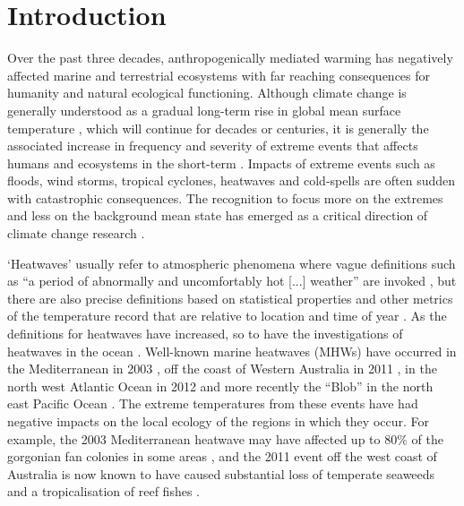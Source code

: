 \documentclass[a4paper,10pt,review]{elsarticle}
\begin{document}
\linenumbers

\section{Introduction}
Over the past three decades, anthropogenically mediated warming has negatively affected marine and terrestrial ecosystems with far reaching consequences for humanity and natural ecological functioning. Although climate change is generally understood as a gradual long-term rise in global mean surface temperature \citep{IPCC2014}, which will continue for decades or centuries, it is generally the associated increase in frequency and severity of extreme events that affects humans and ecosystems in the short-term \citep{Easterling2000}. Impacts of extreme events such as floods, wind storms, tropical cyclones, heatwaves and cold-spells are often sudden with catastrophic consequences. The recognition to focus more on the extremes and less on the background mean state has emerged as a critical direction of climate change research \citep{Jentsch2007}.

`Heatwaves' usually refer to atmospheric phenomena where vague definitions such as ``a period of abnormally and uncomfortably hot [...] weather'' are invoked \citep{Glickman2000}, but there are also precise definitions based on statistical properties and other metrics of the temperature record that are relative to location and time of year \citep[e.g.][]{Meehl2004, Alexander2006, Fischer2010, Fischer2011, Perkins2013}. As the definitions for heatwaves have increased, so to have the investigations of heatwaves in the ocean \citep[e.g.][]{Mackenzie2007, Selig2010, Sura2011, Lima2012, DeCastro2014}. Well-known marine heatwaves (MHWs) have occurred in the Mediterranean in 2003 \citep{Black2004, Olita2007, Garrabou2009}, off the coast of Western Australia in 2011 \citep{Feng2013, Pearce2013, Wernberg2013}, in the north west Atlantic Ocean in 2012 \citep{Mills2012, Chen2014, Chen2015} and more recently the ``Blob'' in the north east Pacific Ocean \citep{Bond2015}. The extreme temperatures from these events have had negative impacts on the local ecology of the regions in which they occur. For example, the 2003 Mediterranean heatwave may have affected up to 80\% of the gorgonian fan colonies in some areas \citep{Garrabou2009}, and the 2011 event off the west coast of Australia is now known to have caused substantial loss of temperate seaweeds and a tropicalisation of reef fishes \citep{Wernberg2013}.
\end{document}
